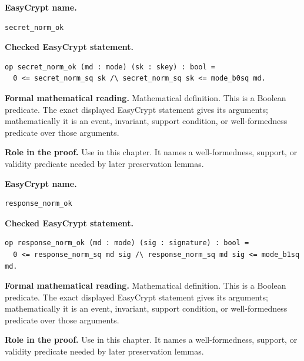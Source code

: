\begin{formaldefinition}
\noindent\textbf{EasyCrypt name.}
\begin{lstlisting}[language=EasyCrypt,basicstyle=\ttfamily\scriptsize]
secret_norm_ok
\end{lstlisting}
\noindent\textbf{Checked EasyCrypt statement.}
\begin{lstlisting}[language=EasyCrypt,basicstyle=\ttfamily\scriptsize]
op secret_norm_ok (md : mode) (sk : skey) : bool =
  0 <= secret_norm_sq sk /\ secret_norm_sq sk <= mode_b0sq md.
\end{lstlisting}
\noindent\textbf{Formal mathematical reading.}
Mathematical definition. This is a Boolean predicate.  The exact displayed EasyCrypt statement gives its arguments; mathematically it is an event, invariant, support condition, or well-formedness predicate over those arguments.

\noindent\textbf{Role in the proof.}
Use in this chapter. It names a well-formedness, support, or validity predicate needed by later preservation lemmas.

\end{formaldefinition}

\begin{formaldefinition}
\noindent\textbf{EasyCrypt name.}
\begin{lstlisting}[language=EasyCrypt,basicstyle=\ttfamily\scriptsize]
response_norm_ok
\end{lstlisting}
\noindent\textbf{Checked EasyCrypt statement.}
\begin{lstlisting}[language=EasyCrypt,basicstyle=\ttfamily\scriptsize]
op response_norm_ok (md : mode) (sig : signature) : bool =
  0 <= response_norm_sq md sig /\ response_norm_sq md sig <= mode_b1sq md.
\end{lstlisting}
\noindent\textbf{Formal mathematical reading.}
Mathematical definition. This is a Boolean predicate.  The exact displayed EasyCrypt statement gives its arguments; mathematically it is an event, invariant, support condition, or well-formedness predicate over those arguments.

\noindent\textbf{Role in the proof.}
Use in this chapter. It names a well-formedness, support, or validity predicate needed by later preservation lemmas.

\end{formaldefinition}

